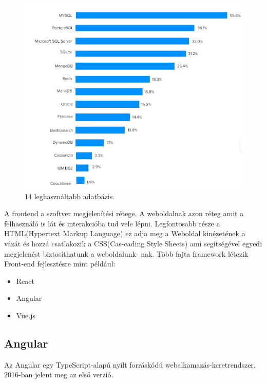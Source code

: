 \begin{figure}[h]
\centering
\includegraphics[scale=0.6]{images/top14_database.png}
\caption{14 leghasználtabb adatbázis.}
\label{fig:Adatbázisok}
\end{figure}
\newpage


A frontend a szoftver megjelenítési rétege. A weboldalnak azon réteg amit a felhasználó is lát és interakcióba tud vele lépni. Legfontosabb része a HTML(Hypertext Markup Language) ez adja meg a Weboldal kinézetének a vázát és hozzá csatlakozik a CSS(Cas-cading Style Sheets) ami segítségével egyedi megjelenést biztosíthatunk a weboldalunk-
nak. Több fajta framework létezik Front-end fejlesztésre mint például:

\begin{itemize}
\item React
\item Angular
\item Vue.js
\end{itemize}


\subsection{Angular}

Az Angular egy TypeScript-alapú nyílt forráskódú webalkamazás-keretrendszer. 2016-ban jelent meg az első verzió.

